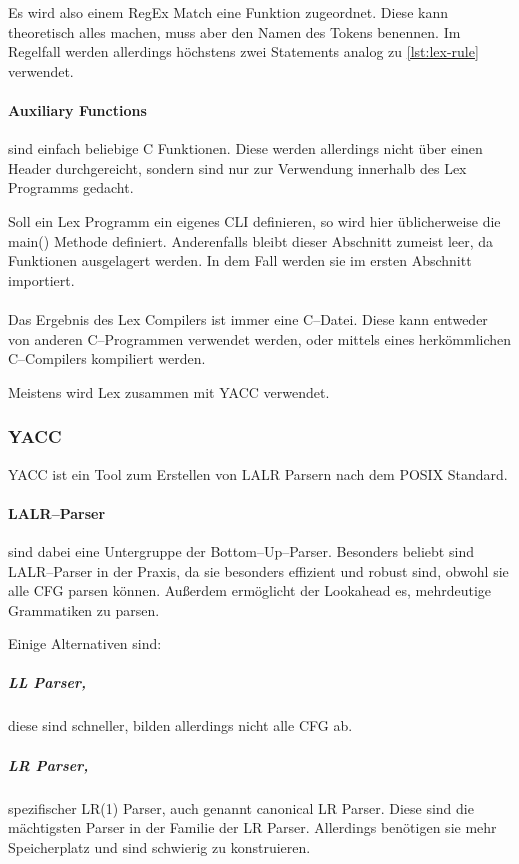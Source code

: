 Es wird also einem \ac{RegEx} Match eine Funktion zugeordnet.
Diese kann theoretisch alles machen, muss aber den Namen des Tokens benennen.
Im Regelfall werden allerdings höchstens zwei Statements analog zu \autoref{lst:lex-rule} verwendet.

\paragraph{Auxiliary Functions} sind einfach beliebige C Funktionen.
Diese werden allerdings nicht über einen Header durchgereicht, sondern sind nur zur Verwendung innerhalb des Lex Programms gedacht.

Soll ein Lex Programm ein eigenes \ac{CLI} definieren, so wird hier üblicherweise die {\ttfamily main()} Methode definiert.
Anderenfalls bleibt dieser Abschnitt zumeist leer, da Funktionen ausgelagert werden.
In dem Fall werden sie im ersten Abschnitt importiert.

\paragraph*{}
Das Ergebnis des Lex Compilers ist immer eine C--Datei.
Diese kann entweder von anderen C--Programmen verwendet werden, oder mittels eines herkömmlichen C--Compilers kompiliert werden.

Meistens wird Lex zusammen mit \ac{YACC} verwendet.

\subsubsection{\acs{YACC}}
\ac{YACC} ist ein Tool zum Erstellen von \ac{LALR} Parsern nach dem \ac{POSIX} Standard.

\paragraph{\acs{LALR}--Parser} sind dabei eine Untergruppe der Bottom--Up--Parser.
Besonders beliebt sind \acs{LALR}--Parser in der Praxis, da sie besonders effizient und robust sind, obwohl sie alle \ac{CFG} parsen können.
Außerdem ermöglicht der Lookahead es, mehrdeutige Grammatiken zu parsen.

Einige Alternativen sind:

\subparagraph{\ac{LL} Parser,} diese sind schneller, bilden allerdings nicht alle \ac{CFG} ab.

\subparagraph{\ac{LR} Parser,} spezifischer LR(1) Parser, auch genannt canonical \acs{LR} Parser.
Diese sind die mächtigsten Parser in der Familie der \ac{LR} Parser.
Allerdings benötigen sie mehr Speicherplatz und sind schwierig zu konstruieren.

